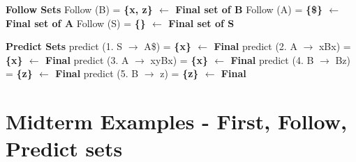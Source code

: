 \documentclass{report}
\begin{document}
\begin{multicols}{2}
\noindent\textbf{Follow Sets}\newline
    Follow (B) = \textbf{ \{x, z\} $\leftarrow$ Final set of B}\newline
    Follow (A) = \textbf{ \{\$\} $\leftarrow$ Final set of A}\newline
    Follow (S) =  \textbf{ \{\} $\leftarrow$ Final set of S}\newline\newline\newline

\noindent\textbf{Predict Sets}\newline
    predict (1. S $\rightarrow$ A\$) = \textbf{ \{x\} $\leftarrow$ Final}\newline
    predict (2. A $\rightarrow$ xBx) = \textbf{ \{x\} $\leftarrow$ Final}\newline
    predict (3. A $\rightarrow$ xyBx) = \textbf{ \{x\} $\leftarrow$ Final}\newline
    predict (4. B $\rightarrow$ Bz) = \textbf{ \{z\} $\leftarrow$ Final}\newline
    predict (5. B $\rightarrow$ z) = \textbf{ \{z\} $\leftarrow$ Final}\newline
\end{multicols}

\renewcommand\thechapter{X1}
\chapter{Midterm Examples - First, Follow, Predict sets}
\end{document}
